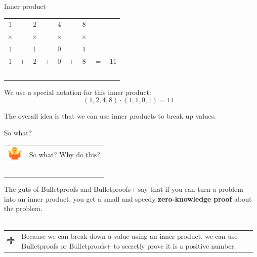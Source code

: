 \documentclass[aspectratio=169]{beamer}
\begin{document}
\begin{frame}{Inner product}
    \begin{table}
        \begin{tabular}{ccccccccc}
            $1$ & & $2$ & & $4$ & & $8$ \\
            $\times$ & & $\times$ & & $\times$ & & $\times$ \\
            $1$ & & $1$ & & $0$ & & $1$ \\
            \hline
            $1$ & $+$ & $2$ & $+$ & $0$ & $+$ & $8$ & $=$ & $11$ \\~\\
        \end{tabular}
    \end{table}

    We use a special notation for this inner product:
    \begin{displaymath}
        (1, 2, 4, 8) \cdot (1, 1, 0, 1) = 11
    \end{displaymath}

    The overall idea is that we can use inner products to break up values.
\end{frame}


\begin{frame}{So what?}
    \begin{tabular}{>{\arraybackslash}m{40px} >{\arraybackslash}m{320px}}
        \includegraphics[width=30px]{images/shrug.png} & So what?
        Why do this? \\~\\
    \end{tabular}

    The guts of Bulletproofs and Bulletproofs+ say that if you can turn a problem into an inner product, you get a small and speedy \textbf{zero-knowledge proof} about the problem. \\~\\

    \begin{tabular}{>{\arraybackslash}m{40px} >{\arraybackslash}m{320px}}
        \includegraphics[width=30px]{images/plus.png} & Because we can break down a value using an inner product, we can use Bulletproofs or Bulletproofs+ to secretly prove it is a positive number.
    \end{tabular}
\end{frame}
\end{document}
